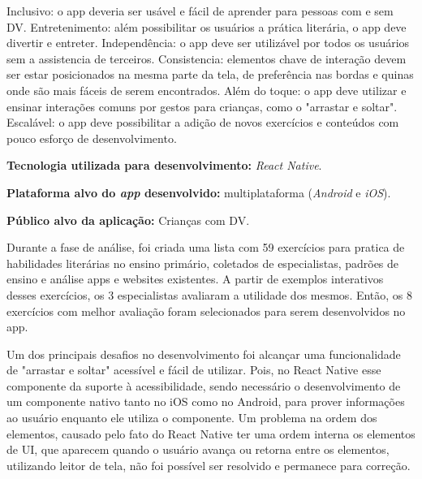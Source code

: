 Inclusivo: o app deveria ser usável e fácil de aprender para pessoas com e sem DV.
Entretenimento: além possibilitar os usuários a prática literária, o app deve divertir e entreter.
Independência: o app deve ser utilizável por todos os usuários sem a assistencia de terceiros.
Consistencia: elementos chave de interação devem ser estar posicionados na mesma parte da tela, de preferência nas bordas e quinas onde são mais fáceis de serem encontrados.
Além do toque: o app deve utilizar e ensinar interações comuns por gestos para crianças, como o "arrastar e soltar".
Escalável: o app deve possibilitar a adição de novos exercícios e conteúdos com pouco esforço de desenvolvimento.

\textbf{Tecnologia utilizada para desenvolvimento:} \emph{React Native}.

\textbf{Plataforma alvo do \emph{app} desenvolvido:} multiplataforma (\emph{Android} e \emph{iOS}).

\textbf{Público alvo da aplicação:} Crianças com DV\@.

Durante a fase de análise, foi criada uma lista com 59 exercícios para pratica de habilidades literárias no ensino primário, coletados de especialistas, padrões de ensino e análise apps e websites existentes.
A partir de exemplos interativos desses exercícios, os 3 especialistas avaliaram a utilidade dos mesmos.
Então, os 8 exercícios com melhor avaliação foram selecionados para serem desenvolvidos no app.

Um dos principais desafios no desenvolvimento foi alcançar uma funcionalidade de "arrastar e soltar" acessível e fácil de utilizar.
Pois, no React Native esse componente da suporte à acessibilidade, sendo necessário o desenvolvimento de um componente nativo tanto no iOS como no Android, para prover informações ao usuário enquanto ele utiliza o componente.
Um problema na ordem dos elementos, causado pelo fato do React Native ter uma ordem interna os elementos de UI, que aparecem quando o usuário avança ou retorna entre os elementos, utilizando leitor de tela, não foi possível ser resolvido e permanece para correção.